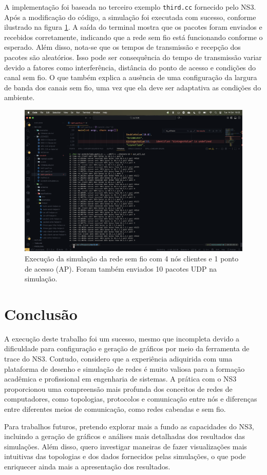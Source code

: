 \documentclass[12pt,a4paper]{article}
\begin{document}
A implementação foi baseada no terceiro exemplo \texttt{third.cc} fornecido pelo NS3. Após a modificação do código, a simulação foi executada com sucesso, conforme ilustrado na figura \ref{fig:wireless_simulation}. A saída do terminal mostra que os pacotes foram enviados e recebidos corretamente, indicando que a rede sem fio está funcionando conforme o esperado. Além disso, nota-se que os tempos de transmissão e recepção dos pacotes são aleatórios. Isso pode ser consequência do tempo de transmissão variar devido a fatores como interferência, distância do ponto de acesso e condições do canal sem fio. O que também explica a ausência de uma configuração da largura de banda dos canais sem fio, uma vez que ela deve ser adaptativa as condições do ambiente.

\begin{figure}
  \centering
  \includegraphics[width=1\textwidth]{run_wifi_4_10.png}
  \caption{Execução da simulação da rede sem fio com 4 nós clientes e 1 ponto de acesso (AP). Foram também enviados 10 pacotes UDP na simulação.}
  \label{fig:wireless_simulation}
\end{figure}

\section{Conclusão}

A execução deste trabalho foi um sucesso, mesmo que incompleta devido a dificuldade para configuração e geração de gráficos por meio da ferramenta de trace do NS3. Contudo, considero que a experiência adiquirida com uma plataforma de desenho e simulação de redes é muito valiosa para a formação acadêmica e profissional em engenharia de sistemas. A prática com o NS3 proporcionou uma compreensão mais profunda dos conceitos de redes de computadores, como topologias, protocolos e comunicação entre nós e diferenças entre diferentes meios de comunicação, como redes cabeadas e sem fio. 

Para trabalhos futuros, pretendo explorar mais a fundo as capacidades do NS3, incluindo a geração de gráficos e análises mais detalhadas dos resultados das simulações. Além disso, quero investigar maneiras de fazer visualizações mais intuitivas das topologias e dos dados fornecidos pelas simulações, o que pode enriquecer ainda mais a apresentação dos resultados. 

\clearpage
{}


\end{document}
